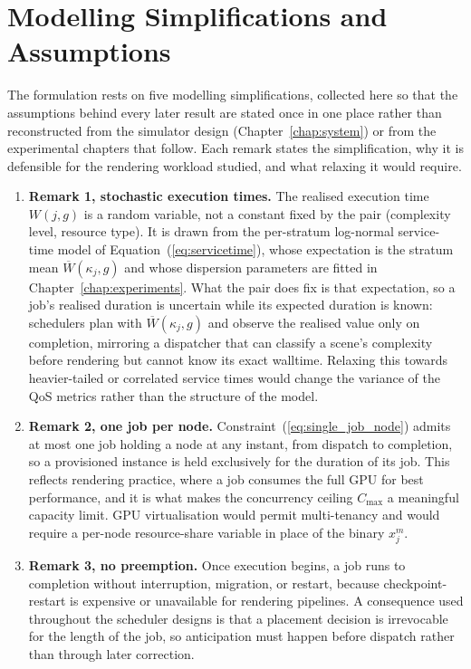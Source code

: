\section{Modelling Simplifications and Assumptions}
\label{sec:modelling-simplifications-and-assumptions}

The formulation rests on five modelling simplifications, collected here so that the assumptions behind every later result are stated once in one place rather than reconstructed from the simulator design (Chapter~\ref{chap:system}) or from the experimental chapters that follow. Each remark states the simplification, why it is defensible for the rendering workload studied, and what relaxing it would require.

\begin{enumerate}
\item \textbf{Remark 1, stochastic execution times.} The realised execution time $W(j,g)$ is a random variable, not a constant fixed by the pair (complexity level, resource type). It is drawn from the per-stratum log-normal service-time model of Equation~(\ref{eq:servicetime}), whose expectation is the stratum mean $\overline{W}(\kappa_j, g)$ and whose dispersion parameters are fitted in Chapter~\ref{chap:experiments}. What the pair does fix is that expectation, so a job's realised duration is uncertain while its expected duration is known: schedulers plan with $\overline{W}(\kappa_j, g)$ and observe the realised value only on completion, mirroring a dispatcher that can classify a scene's complexity before rendering but cannot know its exact walltime. Relaxing this towards heavier-tailed or correlated service times would change the variance of the QoS metrics rather than the structure of the model.

\item \textbf{Remark 2, one job per node.} Constraint~(\ref{eq:single_job_node}) admits at most one job holding a node at any instant, from dispatch to completion, so a provisioned instance is held exclusively for the duration of its job. This reflects rendering practice, where a job consumes the full GPU for best performance, and it is what makes the concurrency ceiling $C_{\max}$ a meaningful capacity limit. GPU virtualisation would permit multi-tenancy and would require a per-node resource-share variable in place of the binary $x_j^m$.

\item \textbf{Remark 3, no preemption.} Once execution begins, a job runs to completion without interruption, migration, or restart, because checkpoint-restart is expensive or unavailable for rendering pipelines. A consequence used throughout the scheduler designs is that a placement decision is irrevocable for the length of the job, so anticipation must happen before dispatch rather than through later correction.


\end{enumerate}
